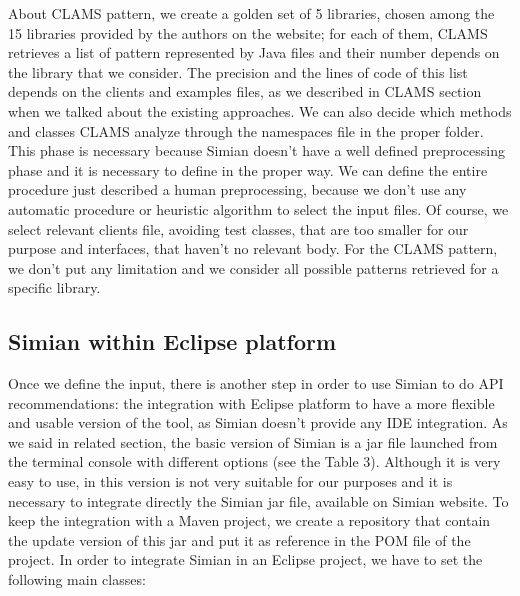About CLAMS pattern, we create a golden set of 5 libraries, chosen among the 15 libraries provided by the authors on the website; for each of them, CLAMS retrieves a list of pattern represented by Java files and their number depends on the library that we consider. The precision and the lines of code of this list depends on the clients and examples files, as we described in CLAMS section when we talked about the existing approaches. We can also decide which methods and classes CLAMS analyze through the namespaces file in the proper folder. This phase is necessary because Simian doesn't have a well defined preprocessing phase and it is necessary to define in the proper way. We can define the entire procedure just described a human preprocessing, because we don't use any automatic procedure or heuristic algorithm to select the input files. Of course, we select relevant clients file, avoiding test classes, that are too smaller for our purpose and interfaces, that haven't no relevant body. For the CLAMS pattern, we don't put any limitation and we consider all possible patterns retrieved for a specific library.


\subsection{Simian within Eclipse platform}
Once we define the input, there is another step in order to use Simian to do API recommendations: the integration with Eclipse platform to have a more flexible and usable version of the tool, as Simian doesn't provide any IDE integration. As we said in related section, the basic version of Simian is a jar file launched from the terminal console with different options (see the Table 3). Although it is very easy to use, in this version is not very suitable for our purposes and it is necessary to integrate directly the Simian jar file, available on Simian website. To keep the integration with a Maven project, we create a repository that contain the update version of this jar and put it as reference in the POM file of the project. 
In order to integrate Simian in an Eclipse project, we have to set the following main classes: 

